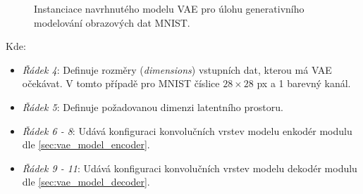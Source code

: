\begin{figure}[H]
    \inputminted[linenos]{python}{code_snippets/vae_model.py}
    \caption{Instanciace navrhnutého modelu VAE pro úlohu generativního modelování obrazových dat MNIST.}
    \label{code:vae_mnist_model}
\end{figure}

Kde:
\begin{itemize}
    \item \emph{Řádek 4}: Definuje rozměry (\emph{dimensions}) vstupních dat, kterou má VAE očekávat. V tomto případě pro MNIST číslice $28 \times 28$ px a 1 barevný kanál.
    \item \emph{Řádek 5}: Definuje požadovanou dimenzi latentního prostoru.
    \item \emph{Řádek 6 - 8}: Udává konfiguraci konvolučních vrstev modelu enkodér modulu dle \autoref{sec:vae_model_encoder}.
    \item \emph{Řádek 9 - 11}: Udává konfiguraci konvolučních vrstev modelu dekodér modulu dle \autoref{sec:vae_model_decoder}. 
\end{itemize}

